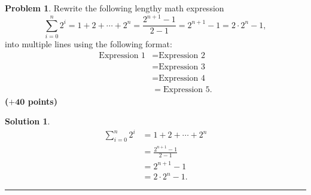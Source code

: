 \documentclass{article}
\theoremstyle{definition}
\newtheorem{problem}{Problem}
\def\fline{\rule{0.75\linewidth}{0.5pt}}
\newcommand{\finishline}{\begin{center}\fline\end{center}}
\newtheorem*{solution*}{Solution}
\newenvironment{solution}{\begin{solution*}}{{\finishline} \end{solution*}}
\newcommand{\grade}[1]{\hfill{\textbf{($\mathbf{#1}$ points)}}}
\begin{document}
\begin{problem}
	Rewrite the following lengthy math expression
	\[
		\sum_{i=0}^{n} 2^i = 1 + 2 + \cdots + 2^n = \frac{2^{n+1}-1}{2-1} = 2^{n+1}-1 = 2 \cdot 2^n - 1,
	\]
	into multiple lines using the following format:
	\begin{align*}
		\text{Expression 1} &= \text{Expression 2} \\
		&= \text{Expression 3} \\
		&= \text{Expression 4} \\
		&= \text{Expression 5}. 
	\end{align*}   \grade{+40} 
\end{problem}

\begin{solution} 
	\begin{align*}
		\sum_{i=0}^{n} 2^i &= 1 + 2 + \cdots + 2^n \\
		&=\frac{2^{n+1}-1}{2-1} \\
		&= 2^{n+1}-1 \\
		&= 2 \cdot 2^n - 1. 
	\end{align*} 
\end{solution}
\end{document}
